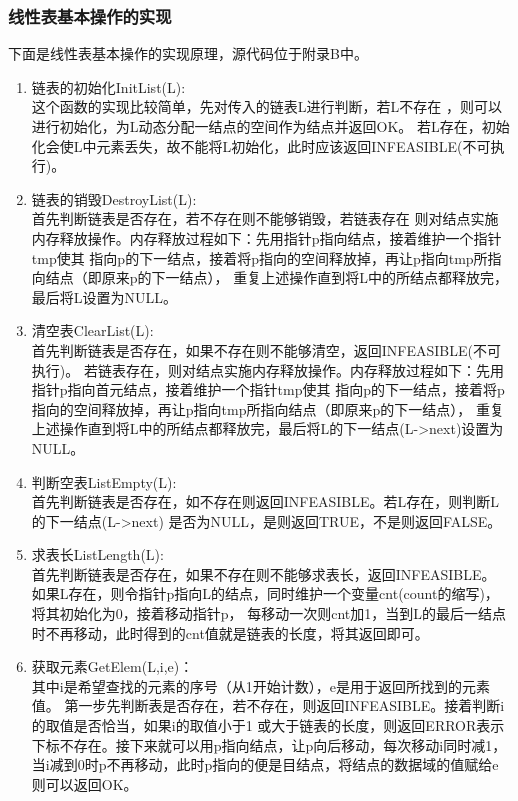 \documentclass[supercite]{Experimental_Report}
\theoremstyle{definition}
\begin{document}
\subsubsection{线性表基本操作的实现}
下面是线性表基本操作的实现原理，源代码位于附录B中。
\begin{enumerate}
	\item 链表的初始化InitList(L):\\这个函数的实现比较简单，先对传入的链表L进行判断，若L不存在
	      ，则可以进行初始化，为L动态分配一结点的空间作为结点并返回OK。
	      若L存在，初始化会使L中元素丢失，故不能将L初始化，此时应该返回INFEASIBLE(不可执行)。

	\item 链表的销毁DestroyList(L):\\首先判断链表是否存在，若不存在则不能够销毁，若链表存在
	      则对结点实施内存释放操作。内存释放过程如下：先用指针p指向结点，接着维护一个指针tmp使其
	      指向p的下一结点，接着将p指向的空间释放掉，再让p指向tmp所指向结点（即原来p的下一结点），
	      重复上述操作直到将L中的所结点都释放完，最后将L设置为NULL。
	
	\item 清空表ClearList(L):\\首先判断链表是否存在，如果不存在则不能够清空，返回INFEASIBLE(不可执行)。
	      若链表存在，则对结点实施内存释放操作。内存释放过程如下：先用指针p指向首元结点，接着维护一个指针tmp使其
	      指向p的下一结点，接着将p指向的空间释放掉，再让p指向tmp所指向结点（即原来p的下一结点），
	      重复上述操作直到将L中的所结点都释放完，最后将L的下一结点(L->next)设置为NULL。
	\item 判断空表ListEmpty(L):\\首先判断链表是否存在，如不存在则返回INFEASIBLE。若L存在，则判断L的下一结点(L->next)
	      是否为NULL，是则返回TRUE，不是则返回FALSE。

	\item 求表长ListLength(L):\\首先判断链表是否存在，如果不存在则不能够求表长，返回INFEASIBLE。
	      如果L存在，则令指针p指向L的结点，同时维护一个变量cnt(count的缩写)，将其初始化为0，接着移动指针p，
	      每移动一次则cnt加1，当到L的最后一结点时不再移动，此时得到的cnt值就是链表的长度，将其返回即可。

	\item 获取元素GetElem(L,i,e)：\\其中i是希望查找的元素的序号（从1开始计数），e是用于返回所找到的元素值。
	      第一步先判断表是否存在，若不存在，则返回INFEASIBLE。接着判断i的取值是否恰当，如果i的取值小于1
	      或大于链表的长度，则返回ERROR表示下标不存在。接下来就可以用p指向结点，让p向后移动，每次移动i同时减1，
	      当i减到0时p不再移动，此时p指向的便是目结点，将结点的数据域的值赋给e则可以返回OK。


\end{enumerate}
\end{document}

